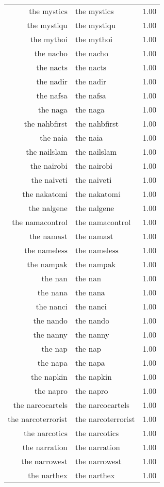 \begin{table}[ht]
\begin{tabular}{rlr}
  the mystics & the mystics & 1.00 \\ 
  the mystiqu & the mystiqu & 1.00 \\ 
  the mythoi & the mythoi & 1.00 \\ 
  the nacho & the nacho & 1.00 \\ 
  the nacts & the nacts & 1.00 \\ 
  the nadir & the nadir & 1.00 \\ 
  the nafsa & the nafsa & 1.00 \\ 
  the naga & the naga & 1.00 \\ 
  the nahbfirst & the nahbfirst & 1.00 \\ 
  the naia & the naia & 1.00 \\ 
  the nailslam & the nailslam & 1.00 \\ 
  the nairobi & the nairobi & 1.00 \\ 
  the naiveti & the naiveti & 1.00 \\ 
  the nakatomi & the nakatomi & 1.00 \\ 
  the nalgene & the nalgene & 1.00 \\ 
  the namacontrol & the namacontrol & 1.00 \\ 
  the namast & the namast & 1.00 \\ 
  the nameless & the nameless & 1.00 \\ 
  the nampak & the nampak & 1.00 \\ 
  the nan & the nan & 1.00 \\ 
  the nana & the nana & 1.00 \\ 
  the nanci & the nanci & 1.00 \\ 
  the nando & the nando & 1.00 \\ 
  the nanny & the nanny & 1.00 \\ 
  the nap & the nap & 1.00 \\ 
  the napa & the napa & 1.00 \\ 
  the napkin & the napkin & 1.00 \\ 
  the napro & the napro & 1.00 \\ 
  the narcocartels & the narcocartels & 1.00 \\ 
  the narcoterrorist & the narcoterrorist & 1.00 \\ 
  the narcotics & the narcotics & 1.00 \\ 
  the narration & the narration & 1.00 \\ 
  the narrowest & the narrowest & 1.00 \\ 
  the narthex & the narthex & 1.00 \\ 

\end{tabular}
\end{table}
